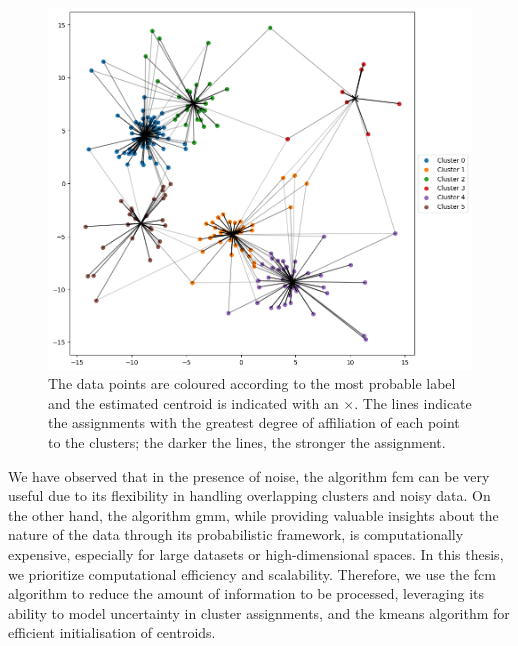 \begin{figure}[H]
	\centering
	\includegraphics[width=0.9\linewidth]{Figures/dati_fcm.png}
	\caption[Example of FCM clustering]{The data points are coloured according to the most probable label and the estimated centroid is indicated with an $\times$. The lines indicate the assignments with the greatest degree of affiliation of each point to the clusters; the darker the lines, the stronger the assignment.}
	\label{fig:data_fcm}
\end{figure}

\bigskip
\noindent We have observed that in the presence of noise, the algorithm \gls{fcm} can be very useful due to its flexibility in handling overlapping clusters and noisy data. On the other hand, the algorithm \gls{gmm}, while providing valuable insights about the nature of the data through its probabilistic framework, is computationally expensive, especially for large datasets or high-dimensional spaces. In this thesis, we prioritize computational efficiency and scalability. Therefore, we use the \gls{fcm} algorithm to reduce the amount of information to be processed, leveraging its ability to model uncertainty in cluster assignments, and the \gls{kmeans} algorithm for efficient initialisation of centroids.
